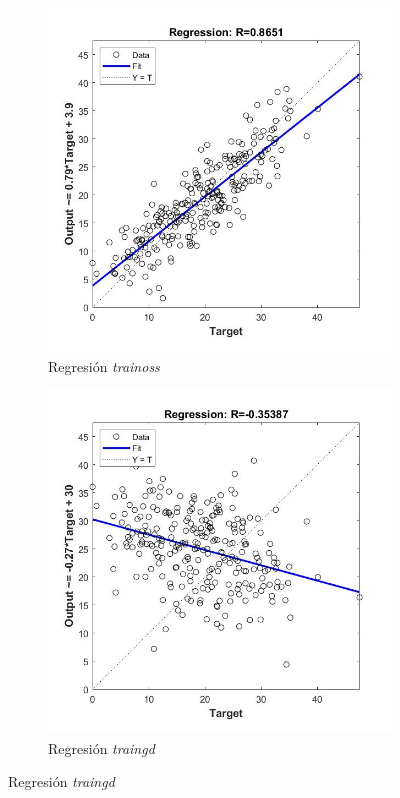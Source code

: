 \documentclass{article}
\begin{document}
\begin{figure}[H]
\begin{subfigure}{0.4\textwidth}
  \includegraphics[width=0.8\linewidth]{../images/I_ex3_regression_bodyfat_dataset_trainoss.jpg}
  \caption{Regresión \textit{trainoss}}
 \end{subfigure}
 \begin{subfigure}{0.4\textwidth}
  \includegraphics[width=0.8\linewidth]{../images/I_ex3_regression_bodyfat_dataset_traingd.jpg}
  \caption{Regresión \textit{traingd}}
 \end{subfigure}
\end{figure}
\end{document}
